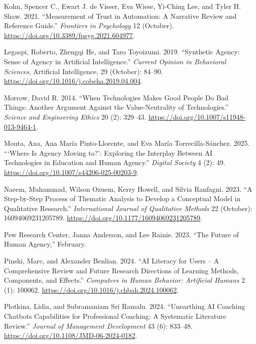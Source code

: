 \documentclass[
  letterpaper,
  DIV=11,
  numbers=noendperiod]{scrartcl}
\newlength{\cslhangindent}
\newenvironment{CSLReferences}[2] %
 {\begin{list}{}{%
  \setlength{\itemindent}{0pt}
  \setlength{\leftmargin}{0pt}
  \setlength{\parsep}{0pt}
  \ifodd #1
   \setlength{\leftmargin}{\cslhangindent}
   \setlength{\itemindent}{-1\cslhangindent}
  \fi
  \setlength{\itemsep}{#2\baselineskip}}}
 {\end{list}}
\begin{document}
\begin{CSLReferences}{1}{0}
Kohn, Spencer C., Ewart J. de Visser, Eva Wiese, Yi-Ching Lee, and Tyler
H. Shaw. 2021. {``Measurement of {Trust} in {Automation}: {A Narrative
Review} and {Reference Guide}.''} \emph{Frontiers in Psychology} 12
(October). \url{https://doi.org/10.3389/fpsyg.2021.604977}.

Legaspi, Roberto, Zhengqi He, and Taro Toyoizumi. 2019. {``Synthetic
Agency: Sense of Agency in Artificial Intelligence.''} \emph{Current
Opinion in Behavioral Sciences}, Artificial {Intelligence}, 29
(October): 84--90. \url{https://doi.org/10.1016/j.cobeha.2019.04.004}.

Morrow, David R. 2014. {``When {Technologies Makes Good People Do Bad
Things}: {Another Argument Against} the {Value-Neutrality} of
{Technologies}.''} \emph{Science and Engineering Ethics} 20 (2):
329--43. \url{https://doi.org/10.1007/s11948-013-9464-1}.

Mouta, Ana, Ana María Pinto-Llorente, and Eva María Torrecilla-Sánchez.
2025. {``{`{Where} Is {Agency Moving} to?'}: {Exploring} the {Interplay}
Between {AI Technologies} in {Education} and {Human Agency}.''}
\emph{Digital Society} 4 (2): 49.
\url{https://doi.org/10.1007/s44206-025-00203-9}.

Naeem, Muhammad, Wilson Ozuem, Kerry Howell, and Silvia Ranfagni. 2023.
{``A {Step-by-Step Process} of {Thematic Analysis} to {Develop} a
{Conceptual Model} in {Qualitative Research}.''} \emph{International
Journal of Qualitative Methods} 22 (October): 16094069231205789.
\url{https://doi.org/10.1177/16094069231205789}.

Pew Research Center, Janna Anderson, and Lee Rainie. 2023. {``The
{Future} of {Human Agency},''} February.

Pinski, Marc, and Alexander Benlian. 2024. {``{AI} Literacy for Users --
{A} Comprehensive Review and Future Research Directions of Learning
Methods, Components, and Effects.''} \emph{Computers in Human Behavior:
Artificial Humans} 2 (1): 100062.
\url{https://doi.org/10.1016/j.chbah.2024.100062}.

Plotkina, Lidia, and Subramaniam Sri Ramalu. 2024. {``Unearthing {AI}
Coaching Chatbots Capabilities for Professional Coaching: A Systematic
Literature Review.''} \emph{Journal of Management Development} 43 (6):
833--48. \url{https://doi.org/10.1108/JMD-06-2024-0182}.


\end{CSLReferences}
\end{document}
